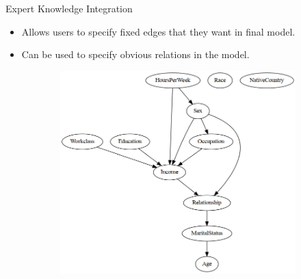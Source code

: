 \documentclass{beamer}
\begin{document}
\begin{frame}{Expert Knowledge Integration}
	\begin{itemize}
		\item Allows users to specify fixed edges that they want in final model.
		\item Can be used to specify obvious relations in the model.
	\end{itemize}

	\begin{figure}
		\begin{subfigure}{0.5 \textwidth}
		\end{subfigure}%
		\begin{subfigure}{0.5 \textwidth}
			\centering
			\includegraphics[scale=0.3]{imgs/adult_bic_fixed.png}
		\end{subfigure}
	\end{figure}
\end{frame}

\end{document}
